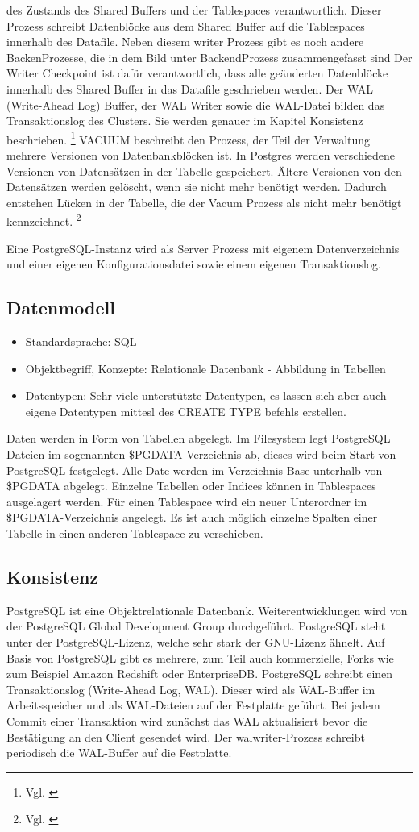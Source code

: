     des Zustands des Shared Buffers und der Tablespaces verantwortlich. Dieser Prozess schreibt Datenblöcke aus dem Shared Buffer auf die Tablespaces innerhalb des Datafile. Neben diesem writer Prozess gibt es noch andere BackenProzesse, die in dem Bild unter BackendProzess zusammengefasst sind
    Der Writer Checkpoint ist dafür verantwortlich, dass alle geänderten Datenblöcke innerhalb des Shared Buffer in das Datafile geschrieben werden. Der WAL (Write-Ahead Log) Buffer, der WAL Writer sowie die WAL-Datei bilden das Transaktionslog des Clusters. Sie werden genauer im Kapitel Konsistenz beschrieben.
    \footnote{Vgl. \cite[Seite 26]{froehlich01}} VACUUM beschreibt den Prozess, der Teil der Verwaltung mehrere Versionen
    von Datenbankblöcken ist. In Postgres werden verschiedene Versionen von Datensätzen in der Tabelle gespeichert. Ältere Versionen von den Datensätzen werden gelöscht, wenn sie nicht mehr benötigt werden. Dadurch entstehen
    Lücken in der Tabelle, die der Vacum Prozess als nicht mehr benötigt kennzeichnet. \footnote{Vgl. \cite[Seite 37]{froehlich01}}

    Eine PostgreSQL-Instanz wird als Server Prozess mit eigenem Datenverzeichnis und einer eigenen Konfigurationsdatei sowie einem eigenen Transaktionslog.
\subsection{Datenmodell}
    \begin{itemize}
        \item Standardsprache: SQL
        \item Objektbegriff, Konzepte: Relationale Datenbank - Abbildung in Tabellen
        \item Datentypen:
        \subitem Sehr viele unterstützte Datentypen, es lassen sich aber auch eigene Datentypen mittesl des CREATE TYPE befehls erstellen.\cite{postgres8}
    \end{itemize}
    Daten werden in Form von Tabellen abgelegt. Im Filesystem legt PostgreSQL Dateien im sogenannten \$PGDATA-Verzeichnis ab, dieses wird beim Start von PostgreSQL festgelegt. Alle Date werden im Verzeichnis Base unterhalb von \$PGDATA abgelegt. Einzelne Tabellen oder Indices können in Tablespaces ausgelagert werden. Für einen Tablespace wird ein neuer Unterordner im \$PGDATA-Verzeichnis angelegt. Es ist auch möglich einzelne Spalten einer Tabelle in einen anderen Tablespace zu verschieben.
\subsection{Konsistenz}
PostgreSQL ist eine Objektrelationale Datenbank. Weiterentwicklungen wird von der PostgreSQL Global Development Group durchgeführt. PostgreSQL steht unter der PostgreSQL-Lizenz, welche sehr stark der GNU-Lizenz ähnelt. Auf Basis von PostgreSQL gibt es mehrere, zum Teil auch kommerzielle, Forks wie zum Beispiel Amazon Redshift oder EnterpriseDB.
PostgreSQL schreibt einen Transaktionslog (Write-Ahead Log, WAL).
Dieser wird als WAL-Buffer im Arbeitsspeicher und als WAL-Dateien auf der Festplatte geführt.
Bei jedem Commit einer Transaktion wird zunächst das WAL aktualisiert bevor die Bestätigung an den Client gesendet wird.
Der walwriter-Prozess schreibt periodisch die WAL-Buffer auf die Festplatte.
